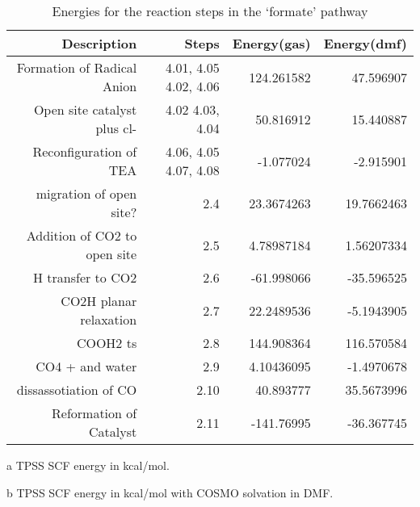 \begin{table}[!htb]
\centering
 \begin{threeparttable}
  \caption{Energies for the reaction steps in the `formate' pathway}
    \begin{tabular}{rrrr}
    \toprule
    Description & Steps & Energy(gas)\tnote{a} & Energy(dmf)\tnote{b} \\
    \midrule
    Formation of Radical Anion & 4.01, 4.05 \ce{->} 4.02, 4.06   & 124.261582 & 47.596907 \\
    Open site catalyst plus cl- & 4.02 \ce{->} 4.03, 4.04 & 50.816912 & 15.440887 \\
    Reconfiguration of TEA & 4.06, 4.05 \ce{->} 4.07, 4.08 & -1.077024 & -2.915901 \\
    \midrule
    migration of open site? & 2.4   & 23.3674263 & 19.7662463 \\
    Addition of CO2 to open site & 2.5   & 4.78987184 & 1.56207334 \\
    H transfer to CO2 & 2.6   & -61.998066 & -35.596525 \\
    CO2H planar relaxation & 2.7   & 22.2489536 & -5.1943905 \\
    COOH2 ts & 2.8   & 144.908364 & 116.570584 \\
    CO4 + and water & 2.9   & 4.10436095 & -1.4970678 \\
    dissassotiation of CO & 2.10  & 40.893777 & 35.5673996 \\
    Reformation of Catalyst & 2.11  & -141.76995 & -36.367745 \\
    \bottomrule
    \end{tabular}%
    \begin{tablenotes}
    \item [a] TPSS SCF energy in kcal/mol.
    \item [b] TPSS SCF energy in kcal/mol with COSMO solvation in DMF.
    \end{tablenotes}
  \label{tab.wgsrxn}%
 \end{threeparttable}
\end{table}%


